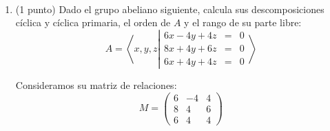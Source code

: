 \documentclass[12pt]{article}
\begin{document}
    \begin{ejercicio}~
        \begin{enumerate}
            \item (1 punto) Dado el grupo abeliano siguiente, calcula sus descomposiciones cíclica y cíclica primaria, el orden de $A$ y el rango de su parte libre:
                \[
                    A = \left\langle x, y, z \left|\begin{array}{rcl}
                        6x - 4y + 4z & = & 0 \\
                        8x + 4y + 6z & = & 0 \\
                        6x + 4y + 4z & = & 0
                    \end{array}\right.\right\rangle
                \]

                Consideramos su matriz de relaciones:
                \[
                    M = \begin{pmatrix}
                        6 & -4 & 4 \\
                        8 & 4 & 6 \\
                        6 & 4 & 4
                    \end{pmatrix}
                \]


\end{enumerate}
\end{ejercicio}
\end{document}
